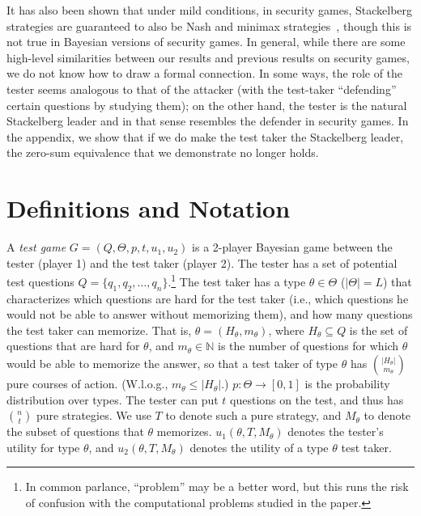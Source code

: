 \documentclass{article}
\begin{document}
It has also been shown that under mild conditions, in security games,
Stackelberg strategies are guaranteed to also be Nash and minimax
strategies~\cite{Korzhyk11:Stackelberg}, though this is not true in
Bayesian versions of
security games.
In general, while there are some high-level similarities between our results and
previous results on security games, we do not know how to draw a formal
connection.  In some ways, the role of the tester seems analogous to
that of the attacker
(with the test-taker ``defending'' certain questions by studying
them); on the other
hand, the tester is the natural Stackelberg leader and in that sense
resembles the defender in security games.
In the appendix, we show that if we do make the test taker the
Stackelberg leader, the zero-sum equivalence that we demonstrate
no longer holds.

\section{Definitions and Notation}


A \emph{test game} $G = (Q, \Theta, p, t, u_1, u_2)$ is a 2-player
Bayesian game
between the tester (player 1) and the test taker (player 2). 
The tester has a set of potential test
questions $Q = \{q_1, q_2, \ldots, q_n\}$.\footnote{In common parlance,
  ``problem'' may be a better word, but this runs the risk of confusion
  with the computational problems studied in the paper.}
  The test taker has a type
$\theta \in \Theta$ ($|\Theta| = L$) that characterizes which questions
are hard for the test taker
 (i.e., which questions he would
not be able to answer without memorizing them), and how many questions the test
taker can memorize.  That is, $\theta = (H_\theta, m_\theta)$, where
$H_\theta \subseteq Q$ is the set of questions that are hard for $\theta$,
and $m_\theta \in \mathbb N$ is the number of questions for which $\theta$
would be able to memorize the answer, so that a test taker of type $\theta$
has $|H_\theta| \choose m_\theta$ pure courses of action.
(W.l.o.g., $m_\theta \leq |H_\theta|$.)
$p: \Theta \rightarrow [0,1]$ is the
probability distribution over types.
The tester can put $t$ questions on the test, and thus has $n \choose t$
pure strategies.  We use $T$ to denote such a pure strategy, and $M_\theta$
to denote the subset of questions that $\theta$ memorizes.  $u_1(\theta, T,
M_\theta)$ denotes the tester's utility for type $\theta$, and $u_2(\theta,
T, M_\theta)$ denotes the utility of a type $\theta$ 
test taker.
\end{document}
